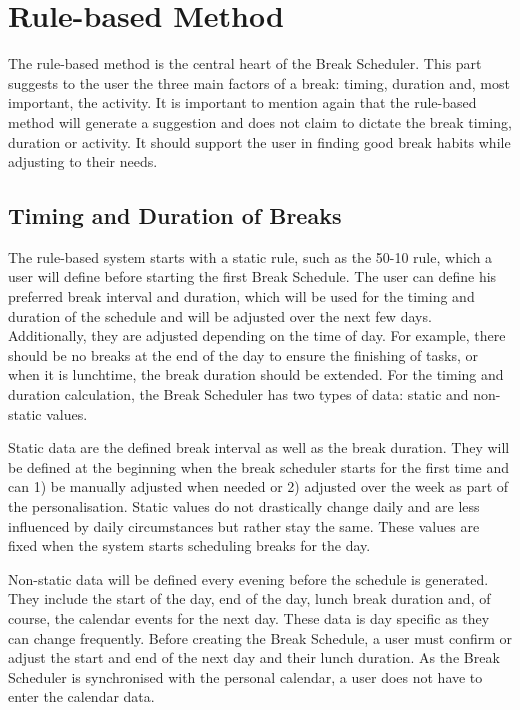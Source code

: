 \documentclass{hasel_thesis}
\begin{document}
\section{Rule-based Method}
The rule-based method is the central heart of the Break Scheduler. This part suggests to the user the three main factors of a break: timing, duration and, most important, the activity. It is important to mention again that the rule-based method will generate a suggestion and does not claim to dictate the break timing, duration or activity. It should support the user in finding good break habits while adjusting to their needs.


\subsection{Timing and Duration of Breaks}
The rule-based system starts with a static rule, such as the 50-10 rule, which a user will define before starting the first Break Schedule. The user can define his preferred break interval and duration, which will be used for the timing and duration of the schedule and will be adjusted over the next few days. Additionally, they are adjusted depending on the time of day. For example, there should be no breaks at the end of the day to ensure the finishing of tasks, or when it is lunchtime, the break duration should be extended. For the timing and duration calculation, the Break Scheduler has two types of data: static and non-static values. 

Static data are the defined break interval as well as the break duration. They will be defined at the beginning when the break scheduler starts for the first time and can 1) be manually adjusted when needed or 2) adjusted over the week as part of the personalisation. Static values do not drastically change daily and are less influenced by daily circumstances but rather stay the same. These values are fixed when the system starts scheduling breaks for the day. 

Non-static data will be defined every evening before the schedule is generated. They include the start of the day, end of the day, lunch break duration and, of course, the calendar events for the next day. These data is day specific as they can change frequently. Before creating the Break Schedule, a user must confirm or adjust the start and end of the next day and their lunch duration. As the Break Scheduler is synchronised with the personal calendar, a user does not have to enter the calendar data.
\end{document}
